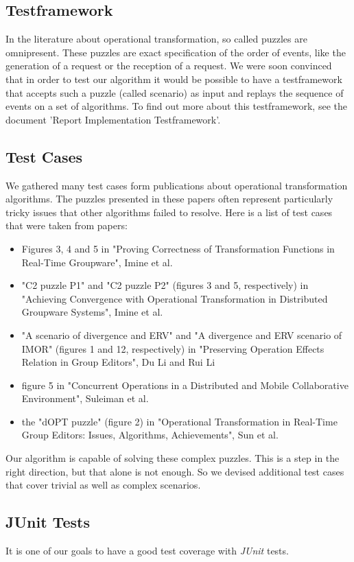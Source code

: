 \subsection{Testframework}
In the literature about operational transformation, so called puzzles are omnipresent. These puzzles are exact specification of the order of events, like the generation of a request or the reception of a request. We were soon convinced that in order to test our algorithm it would be possible to have a testframework that accepts such a puzzle (called scenario) as input and replays the sequence of events on a set of algorithms. To find out more about this testframework, see the document 'Report Implementation Testframework'.

\subsection{Test Cases}
We gathered many test cases form publications about operational transformation algorithms. The puzzles presented in these papers often represent particularly tricky issues that other algorithms failed to resolve. Here is a list of test cases that were taken from papers:

\begin{itemize}
 \item Figures 3, 4 and 5 in "Proving Correctness of Transformation Functions in Real-Time Groupware", Imine et al.
 \item "C2 puzzle P1" and "C2 puzzle P2" (figures 3 and 5, respectively) in "Achieving Convergence with Operational Transformation in Distributed Groupware Systems", Imine et al.
 \item "A scenario of divergence and ERV" and  "A divergence and ERV scenario of IMOR" (figures 1 and 12, respectively) in "Preserving Operation Effects Relation in Group Editors", Du Li and Rui Li
 \item figure 5 in "Concurrent Operations in a Distributed and Mobile Collaborative Environment", Suleiman et al.
 \item the "dOPT puzzle" (figure 2) in "Operational Transformation in Real-Time Group Editors: Issues, Algorithms, Achievements", Sun et al. 
\end{itemize}

Our algorithm is capable of solving these complex puzzles. This is a step in the right direction, but that alone is not enough. So we devised additional test cases that cover trivial as well as complex scenarios.

\subsection{JUnit Tests}
It is one of our goals to have a good test coverage with \emph{JUnit} tests.
